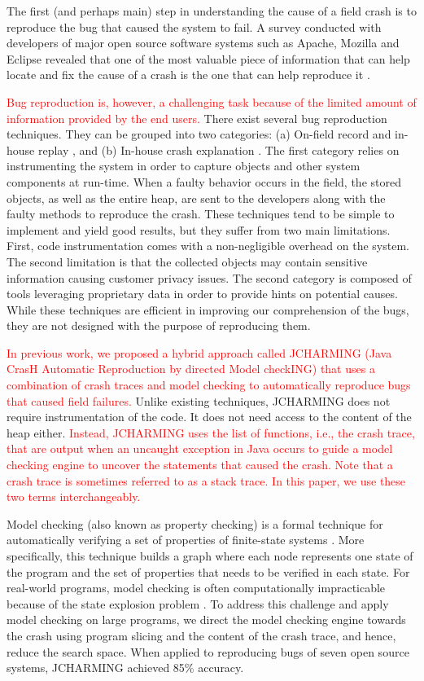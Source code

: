 \documentclass[times, doublespace]{smrauth}
\newcommand{\red}[1]{\textcolor{red}{#1}}
\begin{document}
The first (and perhaps main) step in understanding the cause of a field crash is to reproduce the bug that caused the system to fail. A survey conducted with developers of major open source software systems such as Apache, Mozilla and Eclipse revealed that
one of the most valuable piece of information that can help
locate and fix the cause of a crash is the one that can help
reproduce it \cite{Bettenburg2008}.

\red{Bug reproduction is, however, a challenging task because of the limited amount of information  provided by the end users.} There exist several bug reproduction techniques. They can be grouped into two categories: (a)
On-field record and in-house replay \cite{Narayanasamy2005,Artzi2008,Jaygarl}, and (b) In-house crash explanation \cite{Manevich2004,chandra2009snugglebug}. The first category relies on
instrumenting the system in order to capture objects and other
system components at run-time. When a faulty behavior
occurs in the field, the stored objects, as well as the entire heap,
are sent to the developers along with the faulty methods to
reproduce the crash. These techniques tend to be simple to
implement and yield good results, but they suffer from two
main limitations. First, code instrumentation comes with a
non-negligible overhead on the system. The second limitation
is that the collected objects may contain sensitive information
causing customer privacy issues. The second category is
composed of tools leveraging proprietary data in order to
provide hints on potential causes. While these techniques are
efficient in improving our comprehension of the bugs, they are
not designed with the purpose of reproducing them.

\red{In previous work, we proposed a hybrid approach called JCHARMING
(Java CrasH Automatic Reproduction by directed Model
checkING) \cite{Nayrolles2015} that uses a combination of crash traces and model
checking to automatically reproduce bugs that caused field
failures.} Unlike existing techniques, JCHARMING does not
require instrumentation of the code. It does not need access to
the content of the heap either. \red{Instead, JCHARMING uses the list of functions, i.e., the crash trace, that are output when an uncaught exception in Java
occurs  to guide a model checking engine
to uncover the statements that caused the crash. Note that a crash trace is sometimes referred to as a stack trace. In this paper, we use these two terms interchangeably.}

Model checking (also known as property checking) is a formal
technique for automatically verifying a set of properties of
finite-state systems \cite{Baier2008}. More specifically, this technique
builds a graph where each node represents one
state of the program and the set of properties that needs to be
verified in each state. For real-world programs, model
checking is often computationally impracticable because of
the state explosion problem \cite{Baier2008}. To address this challenge and
apply model checking on large programs, we direct the model
checking engine towards the crash using program slicing and
the content of the crash trace, and hence, reduce the search
space. When applied to reproducing bugs of seven open source  systems, JCHARMING achieved
 85\% accuracy.
\end{document}
